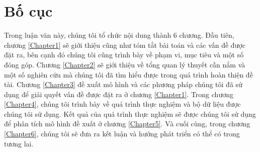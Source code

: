 \section{Bố cục}

Trong luận văn này, chúng tôi tổ chức nội dung thành 6 chương. Đầu tiên, chương \ref{Chapter1} sẽ giới
thiệu cũng như tóm tắt bài toán và các vấn đề được đặt ra, bên cạnh đó chúng tôi cũng trình
bày về phạm vi, mục tiêu và một số đóng góp. Chương \ref{Chapter2} sẽ giới thiệu về tổng quan lý thuyết
cần nắm và một số nghiên cứu mà chúng tôi đã tìm hiểu được trong quá trình hoàn thiện đề
tài. Chương \ref{Chapter3} đề xuất mô hình và các phương pháp chúng tôi đã sử dụng để giải quyết vấn
đề được đặt ra ở chương \ref{Chapter1}. Trong chương \ref{Chapter4}, chúng tôi trình bày về quá trình thực nghiệm
và bộ dữ liệu được chúng tôi sử dụng. Kết quả của quá trình thực nghiệm sẽ được chúng tôi
sử dụng để phân tích mô hình đề xuất ở chương \ref{Chapter5}. Và cuối cùng, trong chương \ref{Chapter6}, chúng tôi sẽ đưa ra kết luận
và hướng phát triển có thể có trong tương lai.
